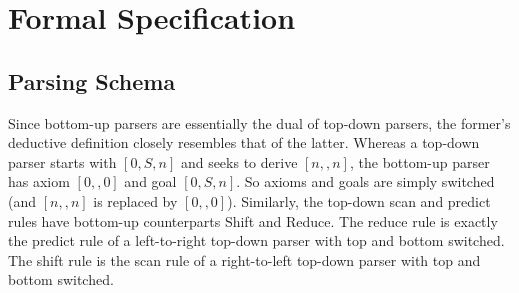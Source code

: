 \begin{center}
    \hspace{1em}
\end{center}


\section{Formal Specification}
\label{sec:BottomUp_Formal}

\subsection{Parsing Schema}
\label{sub:BottomUp_Schema}

Since bottom-up parsers are essentially the dual of top-down parsers, the former's deductive definition closely resembles that of the latter.
Whereas a top-down parser starts with $[0,S,n]$ and seeks to derive $[n,,n]$, the bottom-up parser has axiom $[0,,0]$ and goal $[0,S,n]$.
So axioms and goals are simply switched (and $[n,,n]$ is replaced by $[0,,0]$).
Similarly, the top-down scan and predict rules have bottom-up counterparts Shift and Reduce.
The reduce rule is exactly the predict rule of a left-to-right top-down parser with top and bottom switched.
The shift rule is the scan rule of a right-to-left top-down parser with top and bottom switched. 

